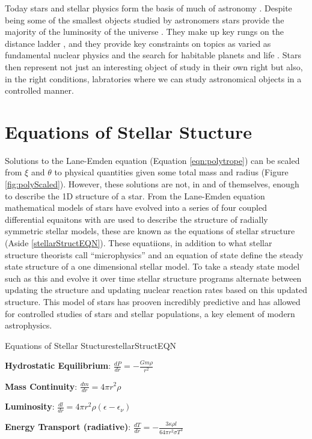 Today stars and stellar physics form the basis of much of astronomy \addcite.
Despite being some of the smallest objects studied by astronomers stars provide
the majority of the luminosity of the universe \addcite. They make up key
rungs on the distance ladder \addcite, and they provide key constraints on
topics as varied as fundamental nuclear physics \addcite and the search for
habitable planets and life \addcite. Stars then represent not just an interesting
object of study in their own right but also, in the right conditions, labratories
where we can study astronomical objects in a controlled manner.

\section{Equations of Stellar Stucture}
Solutions to the Lane-Emden equation (Equation \ref{eqn:polytrope}) can be
scaled from $\xi$ and $\theta$ to physical quantities given some total mass and
radius (Figure \ref{fig:polyScaled}). However, these solutions are not, in and
of themselves, enough to describe the 1D structure of a star. From the
Lane-Emden equation mathematical models of stars have evolved into a series of
four coupled differential equaitons with are used to describe the structure of
radially symmetric stellar models, these are known as the equations of stellar
structure (Aside \ref{stellarStructEQN}). These equatiions, in addition to what
stellar structure theorists call ``microphysics'' and an equation of state
define the steady state structure of a one dimensional stellar model. To take a
steady state model such as this and evolve it over time stellar structure
programs alternate between updating the structure and updating nuclear reaction
rates based on this updated structure. This model of stars has prooven
incredibly predictive and has allowed for controlled studies of stars and
stellar populations, a key element of modern astrophysics.

\begin{sidebar}[l]{Equations of Stellar Stucture}{stellarStructEQN}

  \textbf{Hydrostatic Equilibrium}: $\frac{dP}{dr} = -\frac{Gm\rho}{r^{2}}$

  \textbf{Mass Continuity}: $\frac{dm}{dr} = 4\pi r^{2}\rho$

  \textbf{Luminosity}: $\frac{dl}{dr} = 4\pi r^{2}\rho(\epsilon - \epsilon_{\nu})$

  \textbf{Energy Transport (radiative)}: $\frac{dT}{dr} = -\frac{3\kappa\rho l}{64\pi r^{2}\sigma T^{3}}$
\end{sidebar}


